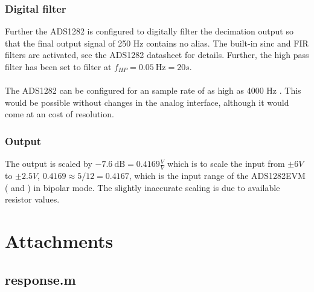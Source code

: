 \documentclass[a4paper]{article}
\begin{document}
\subsubsection{Digital filter}
Further the ADS1282 is configured to digitally filter the decimation
output so that the final output signal of 250 Hz contains no alias. The
built-in sinc and FIR filters are activated, see the ADS1282 datasheet
\cite{ads1282_ds} for details. Further, the high pass filter has been
set to filter at $f_{HP} = 0.05\ \text{Hz} = 20s$.

\paragraph{}The
ADS1282 can be configured for an sample rate of as high as 4000 Hz
\cite{ads1282_ds}. This would be possible without changes in the analog interface, although it would come at an cost of resolution.

\subsubsection{Output} The output is scaled by $-7.6\ \text{dB} =
0.4169 \frac{V}{V}$ which is to scale the input from $\pm 6V$ to $\pm 2.5V$, $0.4169
\approx 5 / 12 = 0.4167$, which is the input range of the ADS1282EVM
(\cite{ads1282evm_ds} and \cite{ads1282_ds}) in bipolar mode. The
slightly inaccurate scaling is due to available resistor values.

\newpage
\printbibliography

\newpage
\section{Attachments}
\subsection{response.m}

\end{document}
